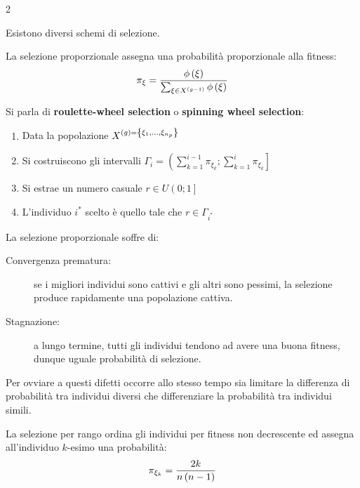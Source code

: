 \documentclass[\main/main.tex]{subfiles}
\begin{document}
\begin{multicols}{2}
\begin{definition}[Selezione]
    Esistono diversi schemi di selezione.
\end{definition}
\begin{definition}
    La selezione proporzionale assegna una probabilità proporzionale alla fitness:
    \[
        \pi_{\xi} = \frac{\phi\left(\xi\right)}{\sum_{\xi\in X^{\left(g-1\right)}} \phi\left(\xi\right)}
    \]    
\end{definition}
\begin{definition}
Si parla di \textbf{roulette-wheel selection} o \textbf{spinning wheel selection}:
\begin{enumerate}
    \item Data la popolazione \(X^{\left(g\right)=\left\{\xi_1, \ldots, \xi_{n_p}\right\}}\)
    \item Si costruiscono gli intervalli \(\Gamma_i = \left(\sum_{k=1}^{i-1} \pi_{\xi_k}; \sum_{k=1}^{i} \pi_{\xi_k}\right]\)
    \item Si estrae un numero casuale \(r \in U\left(0;1\right]\)
    \item L'individuo \(i^*\) scelto è quello tale che \(r \in \Gamma_{i^*}\)
\end{enumerate}
\end{definition}
\begin{observation}
    La selezione proporzionale soffre di:
    \begin{description}
        \item[Convergenza prematura:] se i migliori individui sono cattivi e gli altri sono pessimi, la selezione produce rapidamente una popolazione cattiva.
        \item[Stagnazione:] a lungo termine, tutti gli individui tendono ad avere una buona fitness, dunque uguale probabilità di selezione.
    \end{description}
    Per ovviare a questi difetti occorre allo stesso tempo sia limitare la differenza di probabilità tra individui diversi che differenziare la probabilità tra individui simili.
\end{observation}
\begin{definition}
    La selezione per rango ordina gli individui per fitness non decrescente ed assegna all'individuo \(k\)-esimo una probabilità:
    \[
        \pi_{\xi_k} = \frac{2k}{n\left(n-1\right)}
    \]    
\end{definition}
\begin{observation}

\end{observation}
\end{multicols}
\end{document}
